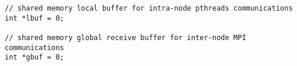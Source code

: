 
\begin{verbatim}
// shared memory local buffer for intra-node pthreads communications
int *lbuf = 0;

// shared memory global receive buffer for inter-node MPI communications
int *gbuf = 0;
\end{verbatim}
